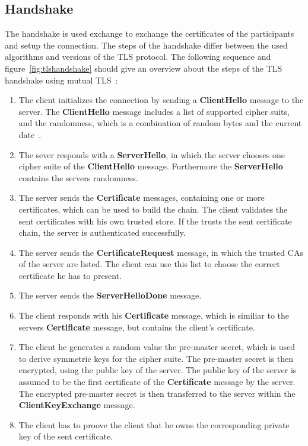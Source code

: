 \subsection{Handshake}
\label{sec:tlshandshake_details}
The handshake is used exchange to exchange the certificates of the participants and setup the connection.
The steps of the handshake differ between the used algorithms and versions of the TLS protocol.
The following sequence and figure~\ref{fig:tlshandshake} should give an overview about the steps of the TLS handshake using mutual TLS~\cite{parsovs2013practical}:
\begin{enumerate}
	\item The client initializes the connection by sending a \textbf{ClientHello} message to the server.
		The \textbf{ClientHello} message includes a list of supported cipher suits, and the randomness, which is a combination of random bytes and the current date~\cite{mediumtls}.
	\item The sever responds with a \textbf{ServerHello}, in which the server chooses one cipher suite of the \textbf{ClientHello} message.
		Furthermore the \textbf{ServerHello} contains the servers randomness.
	\item The server sends the \textbf{Certificate} messages, containing one or more certificates, which can be used to build the chain.
		The client validates the sent certificates with his own trusted store.
		If the trusts the sent certificate chain, the server is authenticated successfully.
	\item The server sends the \textbf{CertificateRequest} message, in which the trusted CAs of the server are listed.
		The client can use this list to choose the correct certificate he has to present.
	\item The server sends the \textbf{ServerHelloDone} message.
	\item The client responds with his \textbf{Certificate} message, which is similiar to the servers \textbf{Certificate} message, but contains the client's certificate.
	\item The client he generates a random value the pre-master secret, which is used to derive symmetric keys for the cipher suite.
		The pre-master secret is then encrypted, using the public key of the server.
		The public key of the server is assumed to be the first certificate of the \textbf{Certificate} message by the server.
		The encrypted pre-master secret is then transferred to the server within the \textbf{ClientKeyExchange} message.
	\item The client has to proove the client that he owns the corresponding private key of the sent certificate.

\end{enumerate}

